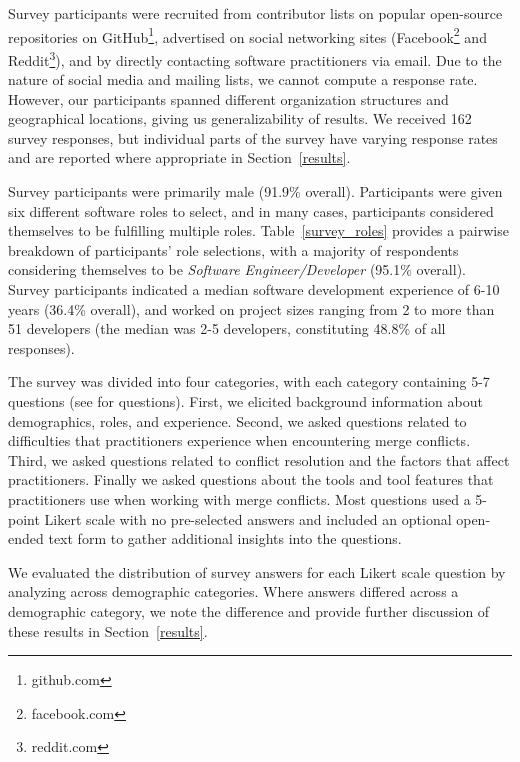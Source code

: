 \renewcommand*{\thefootnote}{\arabic{footnote}}
\setcounter{footnote}{0}
Survey participants were recruited from contributor lists on popular open-source repositories on GitHub\footnote{github.com}, advertised on social networking sites (Facebook\footnote{facebook.com} and Reddit\footnote{reddit.com}), and by directly contacting software practitioners via email. Due to the nature of social media and mailing lists, we cannot compute a response rate. However, our participants spanned different organization structures and geographical locations, giving us generalizability of results.
We received 162 survey responses, but individual parts of the survey have varying response rates and are reported where appropriate in Section~\ref{results}.


Survey participants were primarily male (91.9\% overall). 
Participants were given six different software roles to select, and in many cases, participants considered themselves to be fulfilling multiple roles. 
Table~\ref{survey_roles} provides a pairwise breakdown of participants' role selections, with a majority of respondents considering themselves to be \textit{Software Engineer/Developer} (95.1\% overall).
Survey participants indicated a median software development experience of 6-10 years (36.4\% overall), and worked on project sizes ranging from 2 to more than 51 developers (the median was 2-5 developers, constituting 48.8\% of all responses).

The survey was divided into four categories, with each category containing 5-7 questions (see \cite{companion_site} for questions).
First, we elicited background information about demographics, roles, and experience.
Second, we asked questions related to difficulties that practitioners experience when encountering merge conflicts.
Third, we asked questions related to conflict resolution and the factors that affect practitioners.
Finally we asked questions about the tools and tool features that practitioners use when working with merge conflicts.
Most questions used a 5-point Likert scale with no pre-selected answers and included an optional open-ended text form to gather additional insights into the questions. 

 We evaluated the distribution of survey answers for each Likert scale question by analyzing across demographic categories.
Where answers differed across a demographic category, we note the difference and provide further discussion of these results in Section~\ref{results}.

